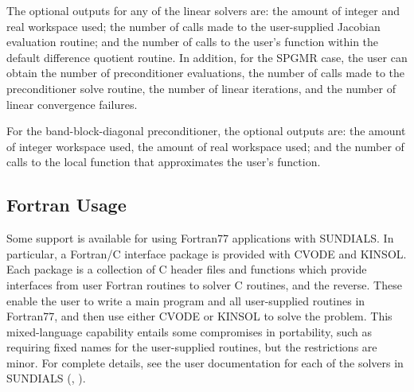The optional outputs for any of the linear solvers are: the amount of 
integer and real workspace used; the number of calls made to the user-supplied 
Jacobian evaluation routine; and the number of calls to the user's function 
within the default difference quotient routine.
In addition, for the SPGMR case, the user can obtain the number of preconditioner
evaluations, the number of calls made to the preconditioner solve
routine, the number of linear iterations, and the number of linear
convergence failures.

For the band-block-diagonal preconditioner, the optional outputs are:
the amount of integer workspace used, the amount of real workspace
used; and the number of calls to the local function that approximates
the user's function.

\subsection{Fortran Usage} 
\label{ss:Fortran_usage}

Some support is available for using Fortran77 applications with
SUNDIALS.  In particular, a Fortran/C interface package is provided
with CVODE and KINSOL.  Each package is a collection of C header files
and functions which provide interfaces from user Fortran routines to
solver C routines, and the reverse.  These enable the user to write a
main program and all user-supplied routines in Fortran77, and then use
either CVODE or KINSOL to solve the problem.  This mixed-language
capability entails some compromises in portability, such as requiring
fixed names for the user-supplied routines, but the restrictions are
minor.  For complete details, see the user documentation for each of
the solvers in SUNDIALS (\cite{HiSe:03a}, \cite{HiSe:03c}).
